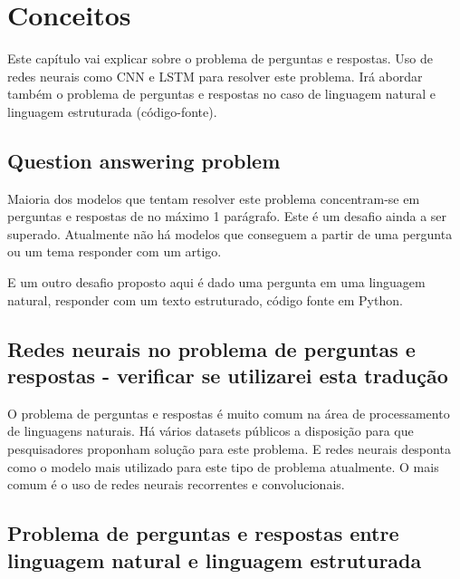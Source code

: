 \chapter{Conceitos}
\label{cap:conceitos}

Este capítulo vai explicar sobre o problema de perguntas e respostas. Uso de redes neurais como CNN e LSTM para resolver este problema. Irá abordar também o problema de perguntas e respostas no caso de linguagem natural e linguagem estruturada (código-fonte).

\section{Question answering problem}
\label{sec:fundamentos}

Maioria dos modelos que tentam resolver este problema concentram-se em perguntas e respostas de no máximo 1 parágrafo. Este é um desafio ainda a ser superado. Atualmente não há modelos que conseguem a partir de uma pergunta ou um tema responder com um artigo. 


E um outro desafio proposto aqui é dado uma pergunta em uma linguagem natural, responder com um texto estruturado, código fonte em Python.




\section{Redes neurais no problema de perguntas e respostas - verificar se utilizarei esta tradução}
\label{sec:exemplo_codigo_fonte}

O problema de perguntas e respostas é muito comum na área de processamento de linguagens naturais. Há vários datasets públicos a disposição para que pesquisadores proponham solução para este problema. E redes neurais desponta como o modelo mais utilizado para este tipo de problema atualmente. O mais comum é o uso de redes neurais recorrentes e convolucionais. 


\section{Problema de perguntas e respostas entre linguagem natural e linguagem estruturada}
\label{sec:algumas_referencias}

